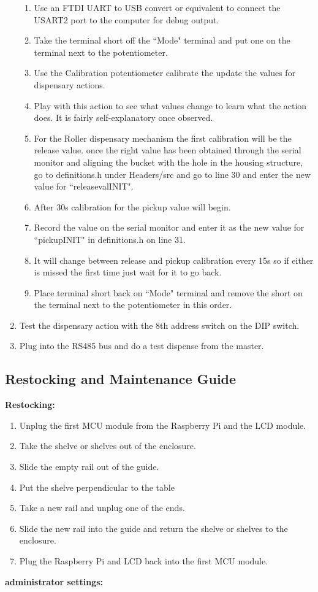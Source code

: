 \documentclass[a4paper,11pt]{article}
\numberwithin{figure}{section}
\numberwithin{table}{section}
\begin{document}
\begin{appendices}
\begin{enumerate}
{\begin{enumerate}
  \item Use an FTDI UART to USB convert or equivalent to connect the USART2 port to the computer for debug output.
  \item Take the terminal short off the ``Mode" terminal and put one on the terminal next to the potentiometer.
  \item Use the Calibration potentiometer calibrate the update the values for dispensary actions. 
  \item Play with this action to see what values change to learn what the action does. It is fairly self-explanatory once observed.
  \item For the Roller dispensary mechanism the first calibration will be the release value. once the right value has been obtained through the serial monitor and aligning the bucket with the hole in the housing structure, go to definitions.h under Headers/src and go to line 30 and enter the new value for ``releasevalINIT".
  \item After 30s calibration for the pickup value will begin.
  \item Record the value on the serial monitor and enter it as the new value for ``pickupINIT" in definitions.h on line 31.
  \item It will change between release and pickup calibration every 15s so if either is missed the first time just wait for it to go back.
  \item Place terminal short back on ``Mode" terminal and remove the short on the terminal next to the potentiometer in this order.
  \end{enumerate}}
  \item Test the dispensary action with the 8th address switch on the DIP switch.
  \item Plug into the RS485 bus and do a test dispense from the master.
\end{enumerate}

\subsection{Restocking and Maintenance Guide}
\label{subsec:maintenace}
\textbf{Restocking:}
\begin{enumerate}
\item Unplug the first MCU module from the Raspberry Pi and the LCD module.
\item Take the shelve or shelves out of the enclosure.
\item Slide the empty rail out of the guide.
\item Put the shelve perpendicular to the table
\item Take a new rail and unplug one of the ends.
\item Slide the new rail into the guide and return the shelve or shelves to the enclosure.
\item Plug the Raspberry Pi and LCD back into the first MCU module.
\end{enumerate}
\textbf{administrator settings:}


\end{appendices}
\end{document}
